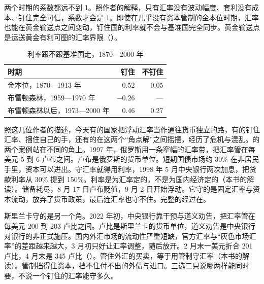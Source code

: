 两个时期的系数都远不到 1\cite{ost2004}。照作者的解释，只有汇率没有波动幅度、套利没有成本、钉住完全可信，系数才会是 1\cite{ost2004}。即使在几乎没有资本管制的金本位时期，汇率也能在黄金输送点之间变动，钉住国的利率就不会与基准国完全同步\cite{ost2004}。黄金输送点是运送黄金有利可图的汇率界限（）。

\begin{table}[tbp]
\centering\small
\caption{利率跟不跟基准国走，1870—2000 年}\label{tab:mundell-ost}
\begin{tabularx}{\linewidth}{@{}X r r@{}}
\toprule
时期 & 钉住 & 不钉住 \\
\midrule
金本位，1870—1913 年 & 0.52 & 0.05 \\
布雷顿森林，1959—1970 年 & $-0.26$ & — \\
布雷顿森林以后，1973—2000 年 & 0.46 & 0.27 \\
\bottomrule
\end{tabularx}
\end{table}

照这几位作者的描述，今天有的国家把浮动汇率当作通往货币独立的路，有的钉住汇率、捆住自己的手，还有的在这两个“角点解”之间摇摆，经历了危机与混乱\cite{ost2004}。的两个案例站在不同的角上。1997 年，俄罗斯用一条窄幅的汇率带，把汇率管在每美元 5 到 6 卢布之间\cite{chiodo2002}。卢布是俄罗斯的货币单位。短期国债市场约 30\% 在非居民手里，资本可以进出\cite{chiodo2002}。守汇率就得用利率，1998 年 5 月中央银行两次加息，把贷款利率从 30\% 提到 150\%\cite{chiodo2002}。利率是为汇率定的，不是为国内经济定的（本书的解读）。储备耗尽，8 月 17 日卢布贬值，9 月 2 日开始浮动\cite{chiodo2002}。它守的是固定汇率与资本流动，放弃了货币政策，最后连汇率也守不住。完整的经过在。

斯里兰卡守的是另一个角。2022 年初，中央银行靠干预与道义劝告，把汇率管在每美元 200 到 203 卢比之间\cite{cbsl2023ar}。卢比是斯里兰卡的货币单位，道义劝告是中央银行对银行的非正式施压。国内外汇市场的流动性严重短缺，官方汇率与“灰色市场汇率”的差距越来越大，3 月初只好让汇率调整，随后放开\cite{cbsl2023ar}。2 月末一美元折合 201 卢比，4 月末是 345 卢比（）\cite{bis2026}。管住外汇的买卖，等于用管制守汇率（本书的解读）。管制挡得住资本，挡不住付不出的外债与进口。三选二只说哪两样能同时要，不说一个钉住的汇率能守多久。

